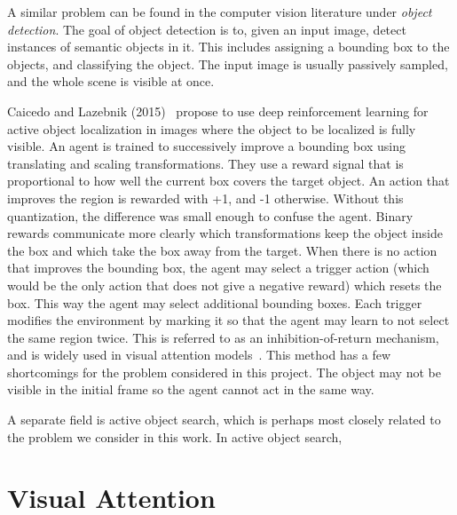 
A similar problem can be found in the computer vision literature under \textit{object detection}.
The goal of object detection is to, given an input image, detect instances of semantic objects in it.
This includes assigning a bounding box to the objects, and classifying the object.
The input image is usually passively sampled, and the whole scene is visible at once.

Caicedo and Lazebnik (2015)~\cite{aol} propose to use deep reinforcement learning for active object localization in images where the object to be localized is fully visible.
An agent is trained to successively improve a bounding box using translating and scaling transformations.
They use a reward signal that is proportional to how well the current box covers the target object.
An action that improves the region is rewarded with +1, and -1 otherwise.
Without this quantization, the difference was small enough to confuse the agent.
Binary rewards communicate more clearly which transformations keep the object inside the box and which take the box away from the target.
When there is no action that improves the bounding box, the agent may select a trigger action (which would be the only action that does not give a negative reward) which resets the box.
This way the agent may select additional bounding boxes.
Each trigger modifies the environment by marking it so that the agent may learn to not select the same region twice.
This is referred to as an inhibition-of-return mechanism, and is widely used in visual attention models~\cite{16 in aol}.
This method has a few shortcomings for the problem considered in this project.
The object may not be visible in the initial frame so the agent cannot act in the same way. 

A separate field is active object search, which is perhaps most closely related to the problem we consider in this work.
In active object search, %

\section{Visual Attention}


